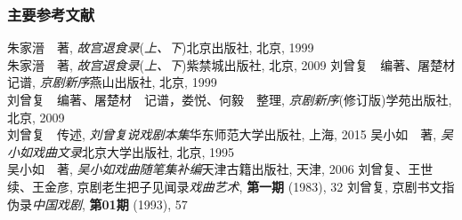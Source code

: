 \documentclass[cjk,slidestop,compress,mathserif,blue]{beamer}
\begin{document}


{
	\frametitle{}
\begin{figure}[h!]
\centering
{}
\label{Pro_Liu_gif}
\end{figure}
}


\frame%
{
\begin{thebibliography}{99}
\frametitle{主要参考文献}
{\small
	朱家溍　著, {\textit{故宫退食录}}\;\textrm{({\textit{上、下}})}\:北京出版社, 北京, 1999\\
朱家溍　著, {\textit{故宫退食录}}\;\textrm{({\textit{上、下}})}\:紫禁城出版社, 北京, 2009
	刘曾复　编著、屠楚材　记谱, {\textit{京剧新序}}\:燕山出版社, 北京, 1999\\
{\fontsize{7.0pt}{3.9pt}\selectfont 刘曾复　编著、屠楚材　记谱，娄悦、何毅　整理, {\textit{京剧新序}}\;\textrm{(修订版)}\:学苑出版社, 北京, 2009}\\
刘曾复　传述, {\textit{刘曾复说戏剧本集}}\:华东师范大学出版社, 上海, 2015
	吴小如　著, {\textit{吴小如戏曲文录}}\:北京大学出版社, 北京, 1995 \\
	吴小如　著, {\textit{吴小如戏曲随笔集补编}}\:天津古籍出版社, 天津, 2006
	\textrm{刘曾复、王世续、王金彦, 京剧老生把子见闻录\:\textit{戏曲艺术}, \textbf{第一期} (1983), 32}
	\textrm{刘曾复, 京剧书文指伪录\:\textit{中国戏剧}, \textbf{第01期} (1993), 57}
}
\nocite*{}
\end{thebibliography}
}
\end{document}
